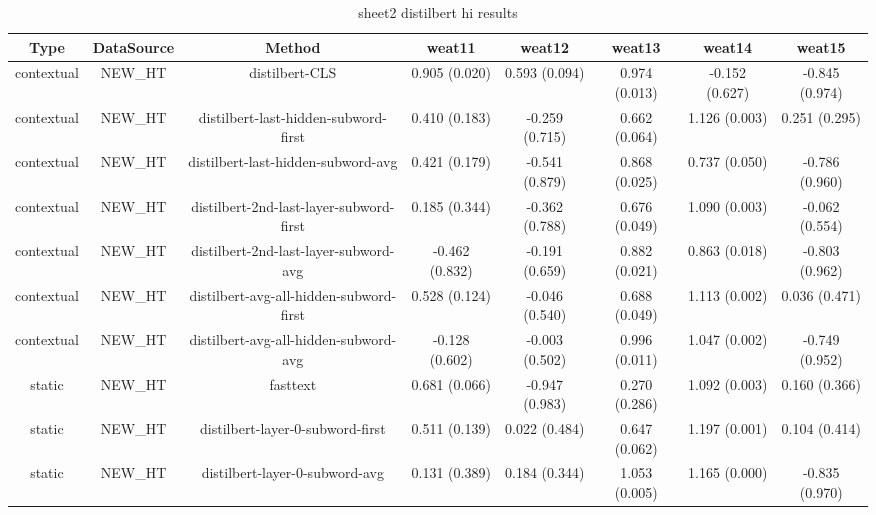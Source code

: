 \begin{sidewaystable}[htb]
    \centering
    \caption{sheet2 distilbert hi results}
    \label{appendix_tab:sheet2_distilbert_hi_results}
    \small
    \begin{tabular}{@{}cccccccc@{}}
        \toprule
        Type & DataSource & Method & weat11 & weat12 & weat13 & weat14 & weat15 \\
        \midrule
        contextual & NEW\_HT & distilbert-CLS & 0.905 (0.020) & 0.593 (0.094) & 0.974 (0.013) & -0.152 (0.627) & -0.845 (0.974) \\
        contextual & NEW\_HT & distilbert-last-hidden-subword-first & 0.410 (0.183) & -0.259 (0.715) & 0.662 (0.064) & 1.126 (0.003) & 0.251 (0.295) \\
        contextual & NEW\_HT & distilbert-last-hidden-subword-avg & 0.421 (0.179) & -0.541 (0.879) & 0.868 (0.025) & 0.737 (0.050) & -0.786 (0.960) \\
        contextual & NEW\_HT & distilbert-2nd-last-layer-subword-first & 0.185 (0.344) & -0.362 (0.788) & 0.676 (0.049) & 1.090 (0.003) & -0.062 (0.554) \\
        contextual & NEW\_HT & distilbert-2nd-last-layer-subword-avg & -0.462 (0.832) & -0.191 (0.659) & 0.882 (0.021) & 0.863 (0.018) & -0.803 (0.962) \\
        contextual & NEW\_HT & distilbert-avg-all-hidden-subword-first & 0.528 (0.124) & -0.046 (0.540) & 0.688 (0.049) & 1.113 (0.002) & 0.036 (0.471) \\
        contextual & NEW\_HT & distilbert-avg-all-hidden-subword-avg & -0.128 (0.602) & -0.003 (0.502) & 0.996 (0.011) & 1.047 (0.002) & -0.749 (0.952) \\
        static & NEW\_HT & fasttext & 0.681 (0.066) & -0.947 (0.983) & 0.270 (0.286) & 1.092 (0.003) & 0.160 (0.366) \\
        static & NEW\_HT & distilbert-layer-0-subword-first & 0.511 (0.139) & 0.022 (0.484) & 0.647 (0.062) & 1.197 (0.001) & 0.104 (0.414) \\
        static & NEW\_HT & distilbert-layer-0-subword-avg & 0.131 (0.389) & 0.184 (0.344) & 1.053 (0.005) & 1.165 (0.000) & -0.835 (0.970) \\
        \bottomrule
    \end{tabular}
\end{sidewaystable}